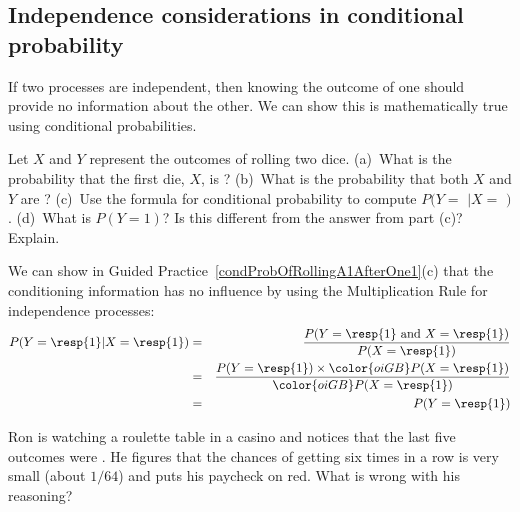 \D{\newpage}

\subsection{Independence considerations in conditional probability}

If two processes are independent, then knowing the outcome of one should provide no information about the other. We can show this is mathematically true using conditional probabilities.

\begin{exercisewrap}
\begin{nexercise} \label{condProbOfRollingA1AfterOne1}
Let $X$ and $Y$ represent the outcomes of rolling two dice. (a)~What is the probability that the first die, $X$, is ? (b)~What is the probability that both $X$ and $Y$ are ? (c)~Use the formula for conditional probability to compute $P(Y =$  $| X = $ $)$. (d)~What is $P(Y=1)$? Is this different from the answer from part (c)? Explain.\footnotemark
\end{nexercise}
\end{exercisewrap}

We can show in Guided Practice~\ref{condProbOfRollingA1AfterOne1}(c) that the conditioning information has no influence by using the Multiplication Rule for independence processes:
\begin{eqnarray*}
P(Y=\text{\resp{1}}|X=\text{\resp{1}})
	&=& \frac{P(Y=\text{\resp{1} and }X=\text{\resp{1}})}{P(X=\text{\resp{1}})} \\
	&=& \frac{P(Y=\text{\resp{1}})\times \color{oiGB}P(X=\text{\resp{1}})}{\color{oiGB}P(X=\text{\resp{1}})} \\
	&=& P(Y=\text{\resp{1}}) \\
\end{eqnarray*}

\begin{exercisewrap}
\begin{nexercise}
Ron is watching a roulette table in a casino and notices that the last five outcomes were . He figures that the chances of getting  six times in a row is very small (about $1/64$) and puts his paycheck on red. What is wrong with his reasoning?\footnotemark
\end{nexercise}
\end{exercisewrap}



